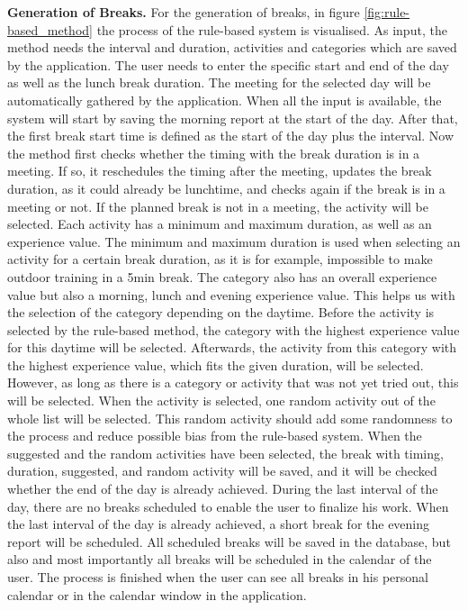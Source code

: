 \documentclass{hasel_thesis}
\begin{document}
\textbf{Generation of Breaks.} For the generation of breaks, in figure \ref{fig:rule-based_method} the process of the rule-based system is visualised. As input, the method needs the interval and duration, activities and categories which are saved by the application. The user needs to enter the specific start and end of the day as well as the lunch break duration. The meeting for the selected day will be automatically gathered by the application. When all the input is available, the system will start by saving the morning report at the start of the day. After that, the first break start time is defined as the start of the day plus the interval. Now the method first checks whether the timing with the break duration is in a meeting. If so, it reschedules the timing after the meeting, updates the break duration, as it could already be lunchtime, and checks again if the break is in a meeting or not. If the planned break is not in a meeting, the activity will be selected. Each activity has a minimum and maximum duration, as well as an experience value. The minimum and maximum duration is used when selecting an activity for a certain break duration, as it is for example, impossible to make outdoor training in a 5min break. The category also has an overall experience value but also a morning, lunch and evening experience value. This helps us with the selection of the category depending on the daytime. Before the activity is selected by the rule-based method, the category with the highest experience value for this daytime will be selected. Afterwards, the activity from this category with the highest experience value, which fits the given duration, will be selected. However, as long as there is a category or activity that was not yet tried out, this will be selected. When the activity is selected, one random activity out of the whole list will be selected. This random activity should add some randomness to the process and reduce possible bias from the rule-based system. When the suggested and the random activities have been selected, the break with timing, duration, suggested, and random activity will be saved, and it will be checked whether the end of the day is already achieved. During the last interval of the day, there are no breaks scheduled to enable the user to finalize his work. When the last interval of the day is already achieved, a short break for the evening report will be scheduled. All scheduled breaks will be saved in the database, but also and most importantly all breaks will be scheduled in the calendar of the user. The process is finished when the user can see all breaks in his personal calendar or in the calendar window in the application.
\end{document}
